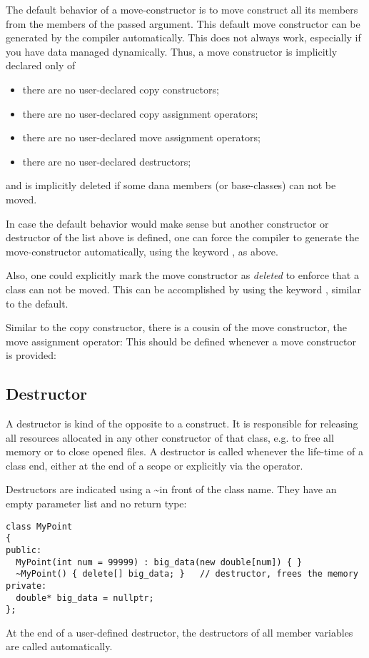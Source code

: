 The default behavior of a move-constructor is to move construct all its members from the members of the passed argument. This default move constructor
can be generated by the compiler automatically. This does not always work, especially if you have data managed dynamically. Thus, a move constructor is
implicitly declared only of
\begin{itemize}
  \item there are no user-declared copy constructors;
  \item there are no user-declared copy assignment operators;
  \item there are no user-declared move assignment operators;
  \item there are no user-declared destructors;
\end{itemize}

and is implicitly deleted if some dana members (or base-classes) can not be moved.

In case the default behavior would make sense but another constructor or destructor of the list above is defined, one can force the compiler to generate
the move-constructor automatically, using the keyword , as above.

Also, one could explicitly mark the move constructor as \emph{deleted} to enforce that a class can not be moved. This can be accomplished by using the
keyword , similar to the default.

Similar to the copy constructor, there is a cousin of the move constructor, the move assignment operator: This should be defined whenever a move constructor
is provided:


\subsection{Destructor\label{sec:destructor}}
A destructor is kind of the opposite to a construct. It is responsible for releasing all resources allocated in any other constructor of that class, e.g.
to free all memory or to close opened files. A destructor is called whenever the life-time of a class end, either at the end of a scope or explicitly via
the  operator.

Destructors are indicated using a \textasciitilde in front of the class name. They have an empty parameter list and no return type:
%
\begin{verbatim}
class MyPoint
{
public:
  MyPoint(int num = 99999) : big_data(new double[num]) { }
  ~MyPoint() { delete[] big_data; }   // destructor, frees the memory
private:
  double* big_data = nullptr;
};
\end{verbatim}
At the end of a user-defined destructor, the destructors of all member variables are called automatically.

